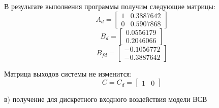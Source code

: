 \documentclass[a4paper,14pt]{extreport}
\begin{document}
В результате выполнения программы получим следующие матрицы:
\begin{equation}
A_d=
\begin{bmatrix}
    1&    0.3887642 \\ 
0&   0.5907868  
\end{bmatrix}
\end{equation}
\begin{equation}
B_d=
\begin{bmatrix}
    0.0556179  \\
0.2046066 \end{bmatrix}
\end{equation}
\begin{equation}
B_{fd} =
\begin{bmatrix}
  - 0.1056772 \\ 
- 0.3887642 \end{bmatrix}
\end{equation}

Матрица выходов системы не изменится:
\begin{equation}
C = C_d =
\begin{bmatrix}
1&0
\end{bmatrix}
\end{equation}


в) получение для дискретного входного воздействия модели ВСВ
\end{document}
